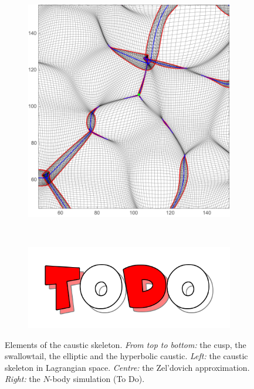 \documentclass[a4paper, 11pt]{article}
\begin{document}
\begin{figure}
\begin{subfigure}[b]{0.3\textwidth}
\includegraphics[width=\textwidth]{Hyperbollic_Z}
\end{subfigure}~
\begin{subfigure}[b]{0.3\textwidth}
\includegraphics[width=\textwidth]{Todo}
\end{subfigure}
\caption{Elements of the caustic skeleton. \textit{From top to bottom:} the cusp, the swallowtail, the elliptic and the hyperbolic caustic. \textit{Left:} the caustic skeleton in Lagrangian space. \textit{Centre:} the Zel'dovich approximation. \textit{Right:} the $N$-body simulation {\color{red}(To Do)}.}\label{fig:caustics_Examples_Big}
\end{figure}

\end{document}

